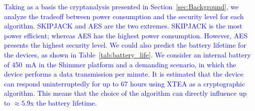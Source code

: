 \documentclass[journal]{IEEEtran}
\newcommand{\rever}{\textcolor{blue}}
\newcommand{\refazer}[1]{{\color{red}{[#1]}}}
\begin{document}
\rever{Taking as a basis the cryptanalysis presented in Section~\ref{sec:Background}, we analyze the tradeoff between power consumption and the  security level for each algorithm. SKIPJACK and AES are the two extremes. SKIPJACK is the most power efficient; whereas AES has the highest power consumption. However, %
AES presents the highest security level. %
}
%
\rever{%
We could also predict the battery lifetime for the devices, as shown in Table~\ref{tab:battery_life}. We consider an internal battery of 450~mA in the Shimmer platform and a demanding scenario, in which the device performs a data transmission per minute. It is estimated that the device can respond uninterruptedly for up to 67 hours using XTEA as a cryptographic algorithm. This means that the choice of the algorithm can directly influence up to $\approx 5.9$x the battery lifetime.}
\end{document}
